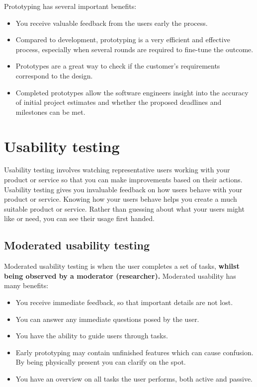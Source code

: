     Prototyping has several important benefits: 
    \begin{itemize}
        \item {You receive valuable feedback from the users early the process.}
        \item { Compared to development, prototyping is a very efficient and effective process, especially when several rounds are required to fine-tune the outcome. }
        \item {Prototypes are a great way to check if the customer's requirements correspond to the design. }
        \item {Completed prototypes allow the software engineers insight into the accuracy of initial project estimates and whether the proposed deadlines and milestones can be met.}
        
    \end{itemize}
    
    
    \section{Usability testing} 
    Usability testing involves watching representative users working with your product or service so that you can make improvements based on their actions. Usability testing gives you invaluable feedback on how users behave with your product or service. Knowing how your users behave helps you create a much suitable product or service. 
    Rather than guessing about what your users might like or need, you can see their usage first handed. 
    
    \subsection{Moderated usability testing}  
    Moderated usability testing is when the user completes a set of tasks, \textbf{whilst being observed by a moderator (researcher).} Moderated usability has many benefits: 
    
    \begin{itemize}
        \item { You receive immediate feedback, so that important details are not lost.}
        \item { You can answer any immediate questions posed by the user.}
        \item { You have the ability to guide users through tasks.}
        \item { Early prototyping may contain unfinished features which can cause confusion. By being physically present you can clarify on the spot.}
        \item { You have an overview on all tasks the user performs, both active and passive.}
    \end{itemize} 
    
